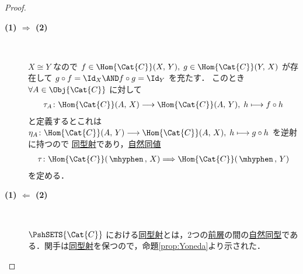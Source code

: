 \documentclass[TQFT_main]{subfiles}
\begin{document}
\begin{proof}
    \begin{description}
        \item[\textbf{(1) $\bm{\Longrightarrow}$ (2)}]　
        
        $X \cong Y$ なので $f \in \Hom{\Cat{C}} (X,\, Y),\; g \in \Hom{\Cat{C}}(Y,\, X)$ が存在して $g \circ f = \Id_X \AND f \circ g = \Id_Y$ を充たす．
        このとき $\forall A \in \Obj{\Cat{C}}$ に対して
        \begin{align}
            \tau_A \colon \Hom{\Cat{C}}(A,\, X) \lto \Hom{\Cat{C}}(A,\, Y),\; h \lmto f \circ h
        \end{align}
        と定義するとこれは $\eta_A \colon \Hom{\Cat{C}}(A,\, Y) \lto \Hom{\Cat{C}}(A,\, X),\; h \lmto g \circ h$ を逆射に持つので
        \hyperref[def:iso]{同型射}であり，\hyperref[def:nat]{自然同値}
        \begin{align}
            \tau \colon \Hom{\Cat{C}} (\, \mhyphen \,,\, X) \Longrightarrow \Hom{\Cat{C}} (\, \mhyphen \,,\, Y)
        \end{align}
        を定める．

        \item[\textbf{(1) $\bm{\Longleftarrow}$ (2)}]　
        
        $\PshSETS{\Cat{C}}$ における\hyperref[def:iso]{同型射}とは，2つの\hyperref[def:presheaf-general]{前層}の間の\hyperref[def:nat]{自然同型}である．関手は\hyperref[def:iso]{同型射}を保つので，命題\ref{prop:Yoneda}より示された．
    \end{description}
    
\end{proof}
\end{document}
